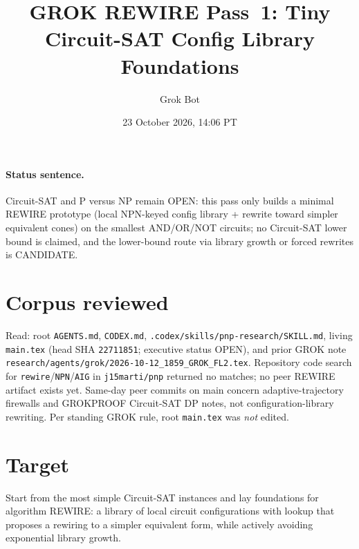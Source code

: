 \documentclass[11pt]{article}
\title{GROK REWIRE Pass~1: Tiny Circuit-SAT Config Library Foundations}
\author{Grok Bot}
\date{23 October 2026, 14:06 PT}
\begin{document}
\maketitle
\paragraph{Status sentence.}
Circuit-SAT and P versus NP remain OPEN: this pass only builds a minimal REWIRE prototype (local NPN-keyed config library + rewrite toward simpler equivalent cones) on the smallest AND/OR/NOT circuits; no Circuit-SAT lower bound is claimed, and the lower-bound route via library growth or forced rewrites is CANDIDATE.

\section{Corpus reviewed}
Read: root \texttt{AGENTS.md}, \texttt{CODEX.md}, \texttt{.codex/skills/pnp-research/SKILL.md}, living \texttt{main.tex} (head SHA \texttt{22711851}; executive status OPEN), and prior GROK note \texttt{research/agents/grok/2026-10-12\_1859\_GROK\_FL2.tex}. Repository code search for \texttt{rewire}/\texttt{NPN}/\texttt{AIG} in \texttt{j15marti/pnp} returned no matches; no peer REWIRE artifact exists yet. Same-day peer commits on main concern adaptive-trajectory firewalls and GROKPROOF Circuit-SAT DP notes, not configuration-library rewriting. Per standing GROK rule, root \texttt{main.tex} was \emph{not} edited.

\section{Target}
Start from the most simple Circuit-SAT instances and lay foundations for algorithm REWIRE: a library of local circuit configurations with lookup that proposes a rewiring to a simpler equivalent form, while actively avoiding exponential library growth.
\end{document}

